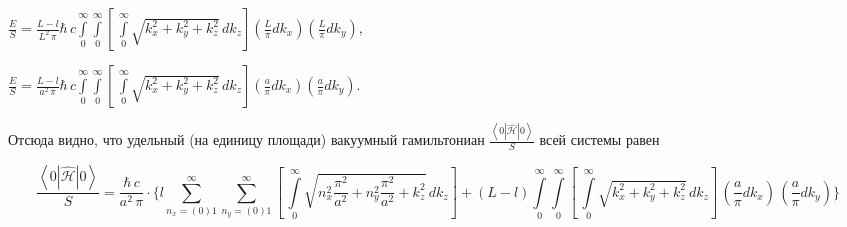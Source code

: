 \documentclass[twoside, 10pt]{article}
\begin{document}
\begin{multicols}{2}

\noindent
\(\frac{E}{S} = \frac{L-l}{L^2\,\pi}\hbar\,c\int\limits_{0}^{\infty}\int\limits_{0}^{\infty}\left[\,\int\limits_{0}^{\infty}\sqrt{k_x^2+k_y^2+k_z^2}\,dk_z\right] \left(\frac{L}{\pi}dk_x\right) \left(\frac{L}{\pi}dk_y\right)\),

\noindent
\(\frac{E}{S} = \frac{L-l}{a^2\,\pi}\hbar\,c\int\limits_{0}^{\infty}\int\limits_{0}^{\infty}\left[\,\int\limits_{0}^{\infty}\sqrt{k_x^2+k_y^2+k_z^2}\,dk_z\right] \left(\frac{a}{\pi}dk_x\right) \left(\frac{a}{\pi}dk_y\right)\).

    Отсюда видно, что удельный (на единицу площади) вакуумный гамильтониан
\(\frac{\left<0|\hat{\mathcal{H}}|0\right>}{S}\) всей системы равен

\end{multicols}


\noindent
\[
\frac{\left<0|\hat{\mathcal{H}}|0\right>}{S} = \frac{\hbar\,c}{a^2\,\pi}
\cdot \Bigg\{l\sum\limits_{n_x=(0)1}^{\infty}\sum\limits_{n_y=(0)1}^{\infty}\left[\,\int\limits_{0}^{\infty}\sqrt{n_x^2\frac{\pi^2}{a^2}+n_y^2\frac{\pi^2}{a^2}+k_z^2}\,dk_z\right] +
(L-l)\int\limits_{0}^{\infty}\int\limits_{0}^{\infty}\left[\,\int\limits_{0}^{\infty}\sqrt{k_x^2+k_y^2+k_z^2}\,dk_z\right]\,\left(\frac{a}{\pi}dk_x\right)\,\left(\frac{a}{\pi}dk_y\right)\Bigg\}
\]
\end{document}
